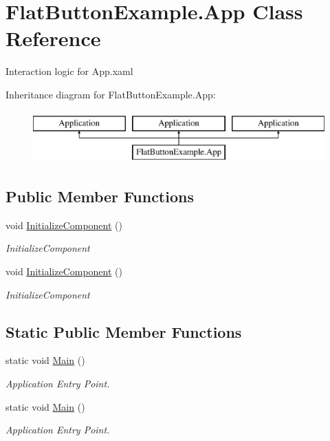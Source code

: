 \hypertarget{class_flat_button_example_1_1_app}{}\section{Flat\+Button\+Example.\+App Class Reference}
\label{class_flat_button_example_1_1_app}


Interaction logic for App.\+xaml  


Inheritance diagram for Flat\+Button\+Example.\+App\+:\begin{figure}[H]
\begin{center}
\leavevmode
\includegraphics[height=2.000000cm]{da/d12/class_flat_button_example_1_1_app}
\end{center}
\end{figure}
\subsection*{Public Member Functions}
\begin{DoxyCompactItemize}
\item 
void \mbox{\hyperlink{class_flat_button_example_1_1_app_a68259d0fcb6478c876f0f56c7f52667f}{Initialize\+Component}} ()
\begin{DoxyCompactList}\small\item\em Initialize\+Component \end{DoxyCompactList}\item 
void \mbox{\hyperlink{class_flat_button_example_1_1_app_a68259d0fcb6478c876f0f56c7f52667f}{Initialize\+Component}} ()
\begin{DoxyCompactList}\small\item\em Initialize\+Component \end{DoxyCompactList}\end{DoxyCompactItemize}
\subsection*{Static Public Member Functions}
\begin{DoxyCompactItemize}
\item 
static void \mbox{\hyperlink{class_flat_button_example_1_1_app_aebce76ca561aa7685a84c90ce202747f}{Main}} ()
\begin{DoxyCompactList}\small\item\em Application Entry Point. \end{DoxyCompactList}\item 
static void \mbox{\hyperlink{class_flat_button_example_1_1_app_aebce76ca561aa7685a84c90ce202747f}{Main}} ()
\begin{DoxyCompactList}\small\item\em Application Entry Point. \end{DoxyCompactList}\end{DoxyCompactItemize}


